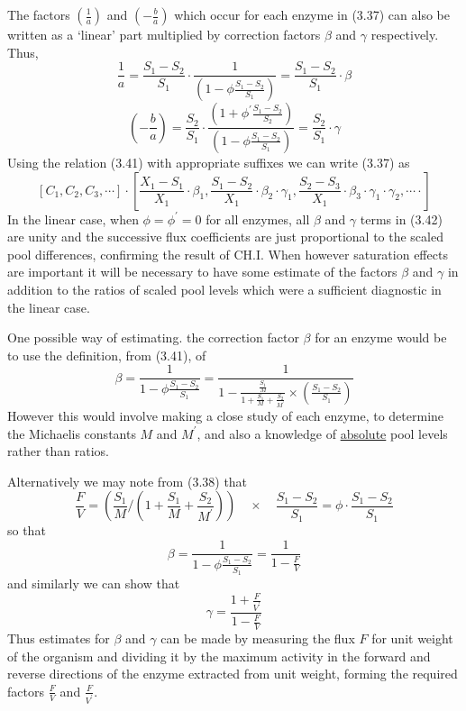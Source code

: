 The factors $\left(\frac{1}{a}\right)$ and $\left(-\frac{b}{a}\right)$ which occur for each enzyme in (3.37) can also be written as a `linear' part multiplied by correction factors $\beta$ and $\gamma$ respectively. Thus,
%
\begin{equation}
\frac{1}{a}=\frac{S_{1}-S_{2}}{S_{1}} \cdot \frac{1}{\left(1-\phi \frac{S_{1}-S_{2}}{S_{1}}\right)}=\frac{S_{1}-S_{2}}{S_{1}} \cdot \beta
\label{eqn:341}
\end{equation}
%
$$\left(-\frac{b}{a}\right)=\frac{S_{2}}{S_{1}} \cdot \frac{\left(1+\phi^{\prime} \frac{S_{1}-S_{2}}{S_{2}}\right)}{\left(1-\phi \frac{S_{1}-S_{2}}{S_{1}}\right)}=\frac{S_{2}}{S_{1}} \cdot \gamma
$$
%
Using the relation (3.41) with appropriate suffixes we can write (3.37) as
%
\begin{equation}
\left[C_{1}, C_{2}, C_{3}, \cdots\right] \cdot \left[\frac{X_1-S_1}{X_1} \cdot \beta_1, \frac{S_1-S_2}{X_1} \cdot \beta_2 \cdot \gamma_1, \frac{S_2-S_3}{X_1} \cdot \beta_3 \cdot \gamma_1 \cdot \gamma_2, \cdots \cdot\right]
\label{eqn:342}
\end{equation}
%
In the linear case, when $\phi=\phi^{\prime}=0$ for all enzymes, all $\beta$ and $\gamma$ terms in (3.42) are unity and the successive flux coefficients are just proportional to the scaled pool differences, confirming the result of CH.I. When however saturation effects are important it will be necessary to have some estimate of the factors $\beta$ and $\gamma$ in addition to the ratios of scaled pool levels which were a sufficient diagnostic in the linear case.

One possible way of estimating. the correction factor $\beta$ for an enzyme would be to use the definition, from (3.41), of
%
\begin{equation}
\beta=\frac{1}{1-\phi \frac{S_{1}-S_2}{S_1}}=\frac{1}{1-\frac{\frac{S_1}{M}}{1+\frac{S_1}{M}+\frac{S_2}{M^{\prime}}} \times\left(\frac{S_1-S_2}{S_1}\right)}
\label{eqn:341}
\end{equation}
%
However this would involve making a close study of each enzyme, to determine the Michaelis constants $M$ and $M^{\prime}$, and also a knowledge of \underline{absolute} pool levels rather than ratios.

Alternatively we may note from (3.38) that
%
$$\frac{F}{V}=\left(\frac{S_1}{M} \big/\left(1+\frac{S_1}{M}+\frac{S_2}{M^{\prime}}\right)\right) \quad \times \quad \frac{S_1-S_2}{S_1} = \phi \cdot \frac{S_1-S_2}{S_1}$$
%
so that
%
\begin{equation}
\beta=\frac{1}{1-\phi \frac{S_{1}-S_{2}}{S_{1}}}=\frac{1}{1-\frac{F}{V}}
\label{eqn:344}
\end{equation}
%
and similarly we can show that
%
\begin{equation}
 \gamma = \frac{1 + \frac{F}{V^\prime}}{1-\frac{F}{V}}
\label{eqn:345}
\end{equation}
%
Thus estimates for $\beta$ and $\gamma$ can be made by measuring the flux $F$ for unit weight of the organism and dividing it by the maximum activity in the forward and reverse directions of the enzyme extracted from unit weight, forming the required factors $\frac{F}{V}$ and $\frac{F}{V^\prime}$.

